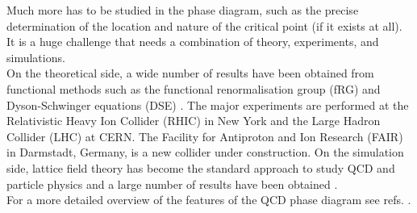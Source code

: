 Much more has to be studied in the phase diagram, such as the precise determination of the location and nature of the critical point (if it exists at all). It is a huge challenge that needs a combination of theory, experiments, and simulations. \\
On the theoretical side, a wide number of results have been obtained from functional methods such as the functional renormalisation group (fRG) and Dyson-Schwinger equations (DSE) \cite{QCDphase,QCDphase2,Gao_2021}.
The major experiments are performed at the Relativistic Heavy Ion Collider (RHIC) in New York and the Large Hadron
Collider (LHC) at CERN. The Facility for Antiproton and Ion Research (FAIR) in Darmstadt, Germany, is a new collider under construction. On the simulation side, lattice field theory has become the standard approach to study QCD and particle physics and a large number of results have been obtained \cite{wuppertal,201915,Endroedi_2014,sym13112079}. \\
For a more detailed overview of the features of the QCD phase diagram see refs. \cite{phasediag1,Bellwied2015}.
